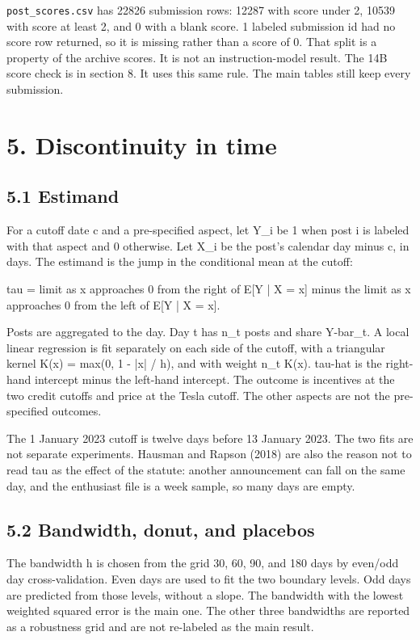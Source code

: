 \documentclass[11pt]{article}
\begin{document}
\texttt{post\_scores.csv} has 22826 submission rows: 12287 with score under 2, 10539 with score at least 2, and 0 with a blank score. 1 labeled submission id had no score row returned, so it is missing rather than a score of 0. That split is a property of the archive scores. It is not an instruction-model result. The 14B score check is in section 8. It uses this same rule. The main tables still keep every submission.


\section{5. Discontinuity in time}

\subsection{5.1 Estimand}

For a cutoff date c and a pre-specified aspect, let Y\_i be 1 when post i is labeled with that aspect and 0 otherwise. Let X\_i be the post's calendar day minus c, in days. The estimand is the jump in the conditional mean at the cutoff:


tau = limit as x approaches 0 from the right of E[Y | X = x] minus the limit as x approaches 0 from the left of E[Y | X = x].


Posts are aggregated to the day. Day t has n\_t posts and share Y-bar\_t. A local linear regression is fit separately on each side of the cutoff, with a triangular kernel K(x) = max(0, 1 - |x| / h), and with weight n\_t K(x). tau-hat is the right-hand intercept minus the left-hand intercept. The outcome is incentives at the two credit cutoffs and price at the Tesla cutoff. The other aspects are not the pre-specified outcomes.


The 1 January 2023 cutoff is twelve days before 13 January 2023. The two fits are not separate experiments. Hausman and Rapson (2018) are also the reason not to read tau as the effect of the statute: another announcement can fall on the same day, and the enthusiast file is a week sample, so many days are empty.


\subsection{5.2 Bandwidth, donut, and placebos}

The bandwidth h is chosen from the grid 30, 60, 90, and 180 days by even/odd day cross-validation. Even days are used to fit the two boundary levels. Odd days are predicted from those levels, without a slope. The bandwidth with the lowest weighted squared error is the main one. The other three bandwidths are reported as a robustness grid and are not re-labeled as the main result.
\end{document}
